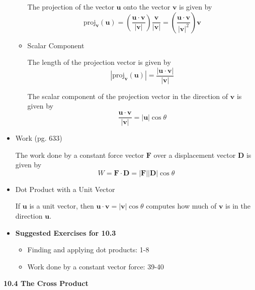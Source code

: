 \documentclass[12pt]{article}
\theoremstyle{plain}
\theoremstyle{definition}
\theoremstyle{remark}
\newcommand{\vect}[1]{\mathbf{#1}}
\begin{document}
\begin{itemize}
\begin{itemize}
			The projection of the vector $\vect{u}$ onto the vector $\vect{v}$ is given by \[\mbox{proj}_{\vect{v}}(\vect{u}) = \left(\frac{\vect{u}\cdot\vect{v}}{|\vect{v}|} \right)\frac{\vect{v}}{|\vect{v}|} = \left(\frac{\vect{u}\cdot\vect{v}}{|\vect{v}|^2} \right)\vect{v}\]
			\item Scalar Component
			
			The length of the projection vector is given by \[|\mbox{proj}_{\vect{v}}(\vect{u})| = \frac{|\vect{u}\cdot\vect{v}|}{|\vect{v}|} \]	
			
			The scalar component of the projection vector in the direction of $\vect{v}$ is given by \[ \frac{\vect{u} \cdot \vect{v}}{|\vect{v}|} = |\vect{u}|\cos \theta \]
			\end{itemize}
		\item Work (pg. 633)
		
		The work done by a constant force vector $\vect{F}$ over a displacement vector $\vect{D}$ is given by \[W = \vect{F} \cdot \vect{D} = |\vect{F}||\vect{D}|\cos \theta\]
		
		\item Dot Product with a Unit Vector
		
		If $\vect{u}$ is a unit vector, then $\vect{u}\cdot\vect{v}=|\vect{v}|\cos\theta$ computes how much of $\vect{v}$ is in the direction $\vect{u}$. 
		
		\item \textbf{Suggested Exercises for 10.3}
			\begin{itemize}
			\item Finding and applying dot products: 1-8
			\item Work done by a constant vector force: 39-40
			\end{itemize}
		\end{itemize}
	
\newpage

\centerline{\bf 10.4 The Cross Product}
	
\end{document}
